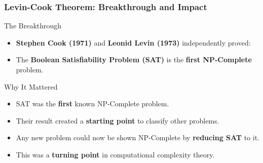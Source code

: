 \documentclass[10pt,aspectratio=43]{beamer}
\begin{document}
\begin{frame}
    \frametitle{Levin-Cook Theorem: Breakthrough and Impact}

    \begin{block}{The Breakthrough}
        \begin{itemize}
            \item \textbf{Stephen Cook (1971)} and \textbf{Leonid Levin (1973)} independently proved:
            \item The \textbf{Boolean Satisfiability Problem (SAT)} is the \textbf{first NP-Complete} problem.
        \end{itemize}
    \end{block}

    \vspace{0.5em}

    \begin{block}{Why It Mattered}
        \begin{itemize}
            \item SAT was the \textbf{first} known NP-Complete problem.
            \item Their result created a \textbf{starting point} to classify other problems.
            \item Any new problem could now be shown NP-Complete by \textbf{reducing SAT} to it.
            \item This was a \textbf{turning point} in computational complexity theory.
        \end{itemize}
    \end{block}
\end{frame}
\end{document}
